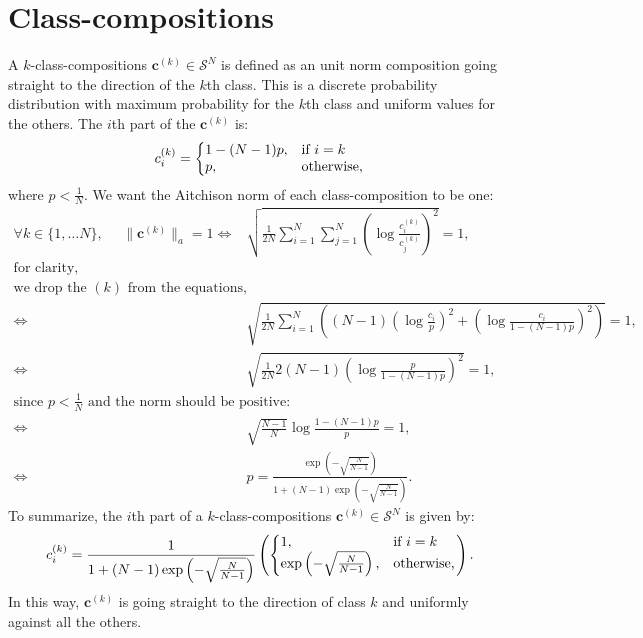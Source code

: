 \documentclass{article}
\theoremstyle{plain}
\theoremstyle{definition}
\theoremstyle{remark}
\begin{document}
\newpage
\section{Class-compositions}

A $k$-class-compositions $\bm{c}^{(k)}  \in \mathcal{S}^N$ is defined as an unit norm composition going straight to the direction of the $k$th class. This is a discrete probability distribution with maximum probability for the $k$th class and uniform values for the others. The $i$th part of the $\bm{c}^{(k)}$ is:
\begin{equation}
    c_i^{(k)} = \left\lbrace
  \begin{array}{@{}ll@{}}
    1-(N-1)p, & \text{if}\ i=k \\
    p, & \text{otherwise,}
  \end{array}\right.
\end{equation}
where $p<\frac{1}{N}$. We want the Aitchison norm of each class-composition to be one:
\begin{equation}
  \begin{aligned}
    \forall k \in \{1, \dots N \},~~~~~~\lVert \bm{c}^{(k)} \rVert_a = 1 \iff& \sqrt{\frac{1}{2N} \sum_{i=1}^N \sum_{j=1}^N \left( \log \frac{c_i^{(k)}}{c_j^{(k)}} \right)^2} = 1,\\
    \text{for clarity,}&\\\text{we drop the $(k)$ from the equations,}&\\
    \iff& \sqrt{\frac{1}{2N} \sum_{i=1}^{N}\left( \left(N-1 \right) \left( \log \frac{c_i}{p} \right)^2 + \left( \log \frac{c_i}{1-(N-1)p} \right)^2 \right)} = 1,\\
    \iff& \sqrt{\frac{1}{2N} 2(N-1) \left( \log \frac{p}{1-(N-1)p} \right)^2} =1,\\
    \text{since $p<\frac{1}{N}$ and the norm should be positive:}&\\
    \iff& \sqrt{\frac{N-1}{N}}\log \frac{1-(N-1)p}{p} =1,\\
    \iff& p = \frac{\exp \left( -\sqrt{\frac{N}{N-1}} \right)}{1+ (N-1)\exp \left( -\sqrt{\frac{N}{N-1}} \right )}.
  \end{aligned}
\end{equation}
To summarize, the $i$th part of a $k$-class-compositions $\bm{c}^{(k)} \in \mathcal{S}^N$ is given by:
\begin{equation}
    c_i^{(k)} =
  \frac{1}{1+ (N-1)\exp \left( -\sqrt{\frac{N}{N-1}} \right )} \left( \left\lbrace \begin{array}{@{}ll@{}}
     1, & \text{if}\ i=k \\
     \exp \left( -\sqrt{\frac{N}{N-1}} \right), & \text{otherwise,}
  \end{array}\right.\right).
\end{equation}
In this way, $\bm{c}^{(k)}$ is going straight to the direction of class $k$ and uniformly against all the others.
\end{document}
